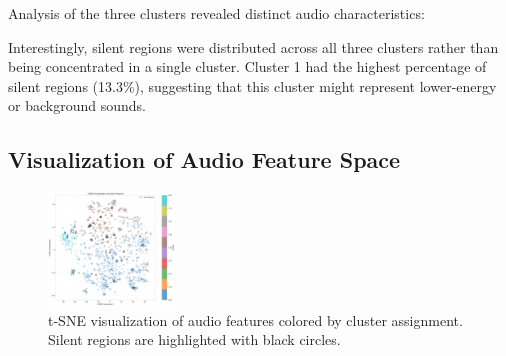 \documentclass{article}
\begin{document}
Analysis of the three clusters revealed distinct audio characteristics:

\begin{table}[H]
  \caption{Characteristics of the three audio feature clusters}
  \label{tab:cluster_chars}
  \centering
\end{table}

Interestingly, silent regions were distributed across all three clusters rather than being concentrated in a single cluster. Cluster 1 had the highest percentage of silent regions (13.3\%), suggesting that this cluster might represent lower-energy or background sounds.

\subsection{Visualization of Audio Feature Space}

\begin{figure}[H]
  \centering
  \includegraphics[width=0.3\textwidth]{figures/audio_features/tsne_visualization.png}
  \caption{t-SNE visualization of audio features colored by cluster assignment. Silent regions are highlighted with black circles.}
  \label{fig:tsne}
\end{figure}
\end{document}
